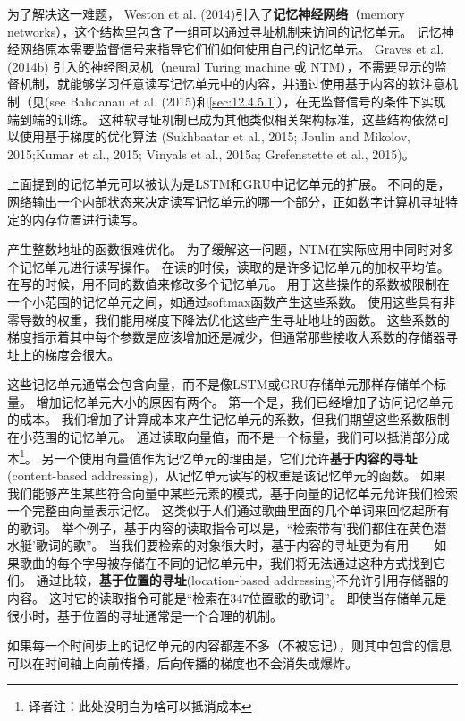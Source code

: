 为了解决这一难题， Weston et al. (2014)引入了\textbf{记忆神经网络}（memory networks），这个结构里包含了一组可以通过寻址机制来访问的记忆单元。
记忆神经网络原本需要监督信号来指导它们们如何使用自己的记忆单元。
 Graves et al. (2014b) 引入的神经图灵机（neural Turing machine 或 NTM），不需要显示的监督机制，就能够学习任意读写记忆单元中的内容，并通过使用基于内容的软注意机制（见(see Bahdanau et al. (2015)和\ref{sec:12.4.5.1}），在无监督信号的条件下实现端到端的训练。
这种软寻址机制已成为其他类似相关架构标准，这些结构依然可以使用基于梯度的优化算法 (Sukhbaatar et al., 2015; Joulin and Mikolov, 2015;Kumar et al., 2015; Vinyals et al., 2015a; Grefenstette et al., 2015)。

上面提到的记忆单元可以被认为是LSTM和GRU中记忆单元的扩展。
不同的是，网络输出一个内部状态来决定读写记忆单元的哪一个部分，正如数字计算机寻址特定的内存位置进行读写。


产生整数地址的函数很难优化。
为了缓解这一问题，NTM在实际应用中同时对多个记忆单元进行读写操作。
在读的时候，读取的是许多记忆单元的加权平均值。
在写的时候，用不同的数值来修改多个记忆单元。
用于这些操作的系数被限制在一个小范围的记忆单元之间，如通过softmax函数产生这些系数。
使用这些具有非零导数的权重，我们能用梯度下降法优化这些产生寻址地址的函数。
这些系数的梯度指示着其中每个参数是应该增加还是减少，但通常那些接收大系数的存储器寻址上的梯度会很大。

这些记忆单元通常会包含向量，而不是像LSTM或GRU存储单元那样存储单个标量。
增加记忆单元大小的原因有两个。
第一个是，我们已经增加了访问记忆单元的成本。
我们增加了计算成本来产生记忆单元的系数，但我们期望这些系数限制在小范围的记忆单元。
通过读取向量值，而不是一个标量，我们可以抵消部分成本\footnote{译者注：此处没明白为啥可以抵消成本}。 
另一个使用向量值作为记忆单元的理由是，它们允许\textbf{基于内容的寻址}(content-based addressing)，从记忆单元读写的权重是该记忆单元的函数。
如果我们能够产生某些符合向量中某些元素的模式，基于向量的记忆单元允许我们检索一个完整由向量表示记忆。
这类似于人们通过歌曲里面的几个单词来回忆起所有的歌词。
举个例子，基于内容的读取指令可以是，“检索带有'我们都住在黄色潜水艇'歌词的歌”。
当我们要检索的对象很大时，基于内容的寻址更为有用——如果歌曲的每个字母被存储在不同的记忆单元中，我们将无法通过这种方式找到它们。
通过比较，\textbf{基于位置的寻址}(location-based addressing)不允许引用存储器的内容。
这时它的读取指令可能是“检索在347位置歌的歌词”。
即使当存储单元是很小时，基于位置的寻址通常是一个合理的机制。

如果每一个时间步上的记忆单元的内容都差不多（不被忘记），则其中包含的信息可以在时间轴上向前传播，后向传播的梯度也不会消失或爆炸。

